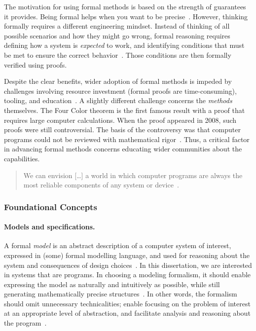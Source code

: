 The motivation for using formal methods is based on the strength of guarantees it provides.
Being formal helps when you want to be precise~\cite{leino2023}.
However, thinking formally requires a different engineering mindset.
Instead of thinking of all possible scenarios and how they might go wrong, formal reasoning requires defining how a system is \emph{expected} to work, and identifying conditions that must be met to ensure the correct behavior~\cite{aws2024}.
Those conditions are then formally verified using proofs.

Despite the clear benefits, wider adoption of formal methods is impeded by challenges involving \eg resource investment (formal proofs are time-consuming), tooling, and education~\cite{beek2024}.
A slightly different challenge concerns the \emph{methods} themselves.
The Four Color theorem is the first famous result with a proof that requires large computer calculations.
When the proof appeared in 2008, such proofs were still controversial.
The basis of the controversy was that computer programs could not be reviewed with mathematical rigor~\cite{gonthier2008}.
Thus, a critical factor in advancing formal methods concerns educating wider communities about the capabilities.

\begin{quotation}
\noindent{}We can envision [\ldots] a world in which computer programs are always the most reliable components of any system or device~\cite{hoare2021}.
\end{quotation}

\subsubsection{Foundational Concepts}
\label{subsubsec:verification-concepts}

\paragraph*{Models and specifications.}
A formal \emph{model} is an abstract description of a computer system of interest, expressed in (some) formal modelling language,
and used for reasoning about the system and consequences of design choices~\cite{zave2023,olveczky2017}.
In this dissertation, we are interested in systems that are programs.
In choosing a modeling formalism, it should enable expressing the model as naturally and intuitively as possible,
while still generating mathematically precise structures~\cite{olveczky2017,beek2024}.
In other words, the formalism should omit unnecessary technicalities;
enable focusing on the problem of interest at an appropriate level of abstraction,
and facilitate analysis and reasoning about the program~\cite{olveczky2017}.

